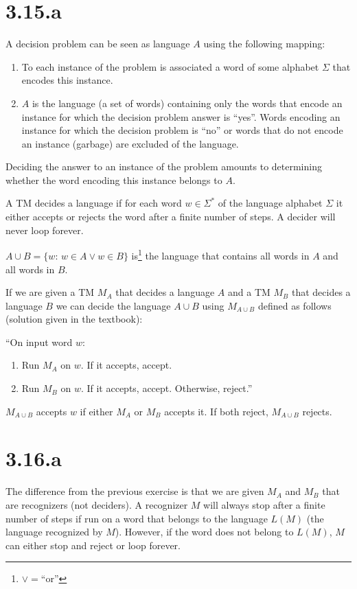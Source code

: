\documentclass{article}
\newcommand{\st}{\colon\,}
\newcommand{\TM}{TM}
\begin{document}
\section*{3.15.a}
A decision problem can be seen as language \(A\) using the following mapping:
\begin{enumerate}
	\item To each instance of the problem is associated a word of some alphabet
		\(\Sigma\) that encodes this instance.
	\item \(A\) is the language (a set of words) containing only
		the words that encode an instance for
		which the decision problem answer is ``yes''. Words encoding an
		instance for which the decision problem is ``no'' or words that do not
		encode an instance (garbage) are excluded of the language.
\end{enumerate}
Deciding the answer to an instance of the problem amounts to determining
whether the word encoding this instance belongs to \(A\).

A \TM{} decides a language if for each word \(w \in \Sigma^{*}\)
of the language alphabet \(\Sigma\)
it either accepts or rejects the word after a finite number of steps. A decider
will never loop forever.

\(A \cup B = \{w \st w \in A \lor w \in B\}\)
is\footnote{\(\lor = \text{``or''}\)}
the language that contains all words in \(A\) and all words in \(B\).

If we are given a \TM{} \(M_A\) that decides a language \(A\) and
a \TM{} \(M_B\) that decides a language \(B\) we can decide the
language \(A \cup B\) using \(M_{A \cup B}\) defined as follows
(solution given in the textbook):

``On input word \(w\):
\begin{enumerate}
	\item Run \(M_A\) on \(w\). If it accepts, accept.
	\item Run \(M_B\) on \(w\). If it accepts, accept. Otherwise, reject.''
\end{enumerate}
\(M_{A \cup B}\) accepts \(w\) if either \(M_A\) or \(M_B\) accepts it.
If both reject, \(M_{A \cup B}\) rejects.

\section*{3.16.a}

The difference from the previous exercise is that we are given \(M_A\) and
\(M_B\) that are recognizers (not deciders). A recognizer \(M\) will always stop
after a finite number of steps if run on a word that belongs to the language
\(L(M)\) (the language recognized by \(M\)).
However, if the word does not belong to \(L(M)\), \(M\) can either stop and reject or loop forever.
\end{document}
